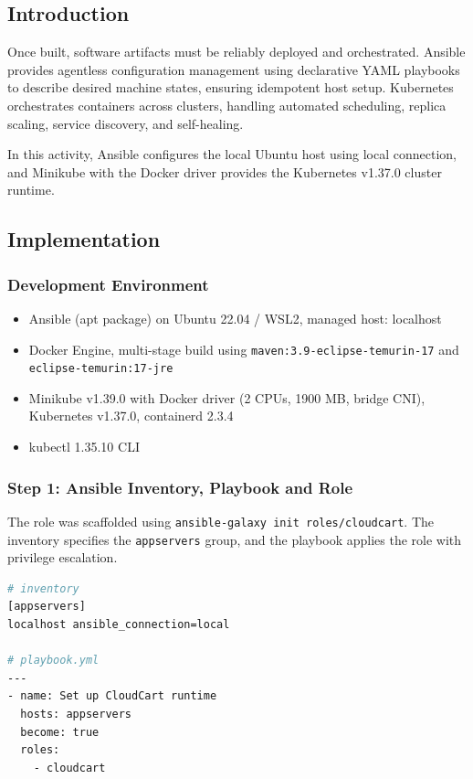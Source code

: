 \documentclass[12pt,a4paper]{article}
\begin{document}
\subsection*{Introduction}
Once built, software artifacts must be reliably deployed and orchestrated. Ansible provides agentless configuration management using declarative YAML playbooks to describe desired machine states, ensuring idempotent host setup. Kubernetes orchestrates containers across clusters, handling automated scheduling, replica scaling, service discovery, and self-healing.

In this activity, Ansible configures the local Ubuntu host using local connection, and Minikube with the Docker driver provides the Kubernetes v1.37.0 cluster runtime.

\subsection*{Implementation}

\subsubsection*{Development Environment}
\begin{itemize}[nosep]
    \item Ansible (apt package) on Ubuntu 22.04 / WSL2, managed host: localhost
    \item Docker Engine, multi-stage build using \texttt{maven:3.9-eclipse-temurin-17} and \texttt{eclipse-temurin:17-jre}
    \item Minikube v1.39.0 with Docker driver (2 CPUs, 1900 MB, bridge CNI), Kubernetes v1.37.0, containerd 2.3.4
    \item kubectl 1.35.10 CLI
\end{itemize}

\subsubsection*{Step 1: Ansible Inventory, Playbook and Role}
The role was scaffolded using \texttt{ansible-galaxy init roles/cloudcart}. The inventory specifies the \texttt{appservers} group, and the playbook applies the role with privilege escalation.

\begin{lstlisting}[language=bash]
# inventory
[appservers]
localhost ansible_connection=local

# playbook.yml
---
- name: Set up CloudCart runtime
  hosts: appservers
  become: true
  roles:
    - cloudcart
\end{lstlisting}
\end{document}
